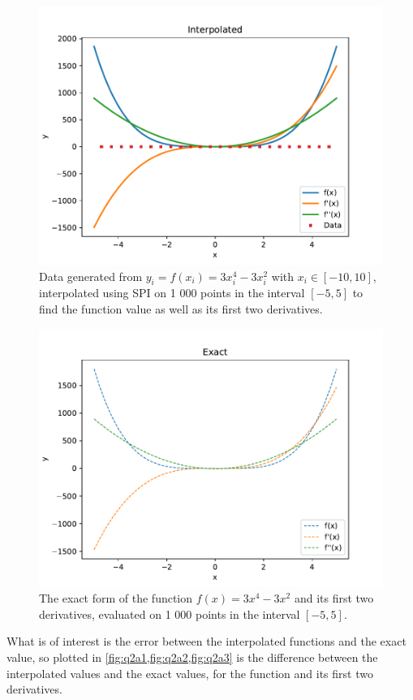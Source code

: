 \documentclass[11pt]{article}
\begin{document}
\begin{enumerate}
    \begin{figure}[h]
        \begin{center}
            \includegraphics[width=.6\textwidth]{Plots/q2afunc.pdf}
            \caption{Data generated from $y_i=f(x_i)=3x_i^4-3x_i^2$ with $x_i\in[-10,10]$, interpolated using SPI on 1 000 points in the interval $[-5,5]$ to find the function value as well as its first two derivatives.}
            \label{fig:q2afunc}
        \end{center}
    \end{figure}
    
    \begin{figure}[h]
        \begin{center}
            \includegraphics[width=.6\textwidth]{Plots/q2aexact.pdf}
            \caption{The exact form of the function $f(x)=3x^4-3x^2$ and its first two derivatives, evaluated on 1 000 points in the interval $[-5,5]$.}
            \label{fig:q2aexact}
        \end{center}
    \end{figure}
    
    What is of interest is the error between the interpolated functions and the exact value, so plotted in \cref{fig:q2a1,fig:q2a2,fig:q2a3} is the difference between the interpolated values and the exact values, for the function and its first two derivatives.


\end{enumerate}
\end{document}
